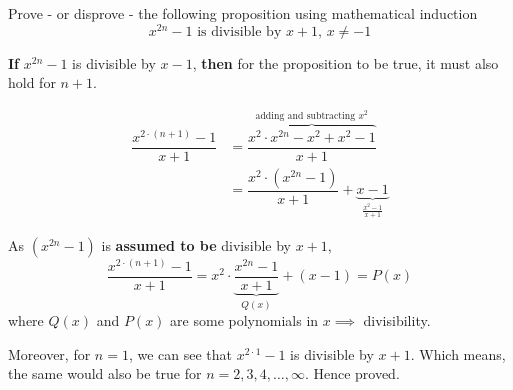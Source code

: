 
\question[4] Prove - or disprove - the following proposition using mathematical induction 
\[ x^{2n} - 1 \text{ is divisible by } x + 1,\, x\neq -1 \]

\insertQR{}

\begin{solution}[\halfpage]
  \textbf{If} $x^{2n}-1$ is divisible by $x-1$, \textbf{then} for the proposition to be 
  true, it must also hold for $n+1$. 

  \begin{align}
    \dfrac{x^{2\cdot(n+1)}-1}{x+1} &= \overbrace{\dfrac{x^2\cdot x^{2n} - x^2 + x^2 - 1}{x+1}}^{\text{adding and subtracting $x^2$}} \\
    &= \dfrac{x^2\cdot (x^{2n} - 1)}{x+1} + \underbrace{x-1}_{\frac{x^2-1}{x+1}}
  \end{align}

  As $(x^{2n}-1)$ is \textbf{assumed to be} divisible by $x+1$, 
  \[ \dfrac{x^{2\cdot (n+1)} - 1}{x + 1} = x^2\cdot\underbrace{\dfrac{x^{2n}-1}{x+1}}_{Q(x)} + (x-1) = P(x)\]
  where $Q(x)$ and $P(x)$ are some polynomials in $x\implies$ divisibility.

  Moreover, for $n=1$, we can see that $x^{2\cdot 1}-1$ is divisible by $x+1$. Which means, 
  the same would also be true for $n=2,3,4,\ldots,\infty$. Hence proved.
\end{solution}
